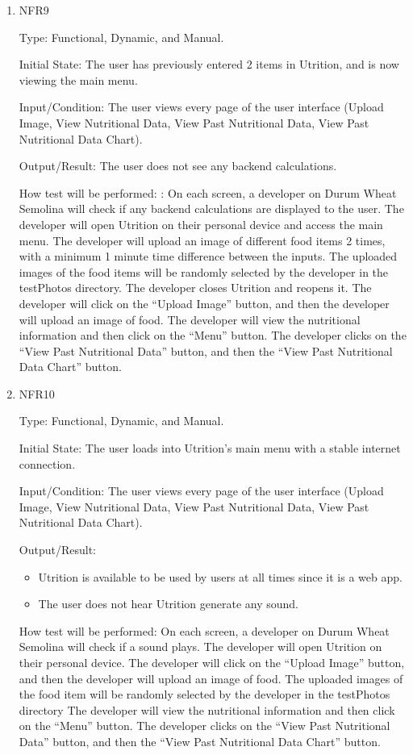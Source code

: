 \documentclass[12pt, titlepage]{article}
\begin{document}
\begin{enumerate}
\item{NFR9\\}

Type: Functional, Dynamic, and Manual.

Initial State: The user has previously entered 2 items in Utrition, and is now viewing the main menu.

Input/Condition: The user views every page of the user interface (Upload Image, View Nutritional Data, View Past Nutritional Data, View Past Nutritional Data Chart).

Output/Result: The user does not see any backend calculations.

How test will be performed: : On each screen, a developer on Durum Wheat Semolina will check if any backend calculations are displayed to the user. The developer will open Utrition on their personal device and access the main menu. The developer will upload an image of different food items 2 times, with a minimum 1 minute time difference between the inputs. The uploaded images of the food items will be randomly selected by the developer in the testPhotos directory. The developer closes Utrition and reopens it. The developer will click on the “Upload Image” button, and then the developer will upload an image of food. The developer will view the nutritional information and then click on the “Menu” button. The developer clicks on the “View Past Nutritional Data'' button, and then the “View Past Nutritional Data Chart” button.

\item{NFR10\\}

Type: Functional, Dynamic, and Manual.

Initial State: The user loads into Utrition’s main menu with a stable internet connection.

Input/Condition: The user views every page of the user interface (Upload Image, View Nutritional Data, View Past Nutritional Data, View Past Nutritional Data Chart).

Output/Result: 
\begin{itemize}
	\item Utrition is available to be used by users at all times since it is a web app.
	\item The user does not hear Utrition generate any sound.
\end{itemize}

How test will be performed: On each screen, a developer on Durum Wheat Semolina will check if a sound plays. The developer will open Utrition on their personal device. The developer will click on the “Upload Image” button, and then the developer will upload an image of food. The uploaded images of the food item will be randomly selected by the developer in the testPhotos directory The developer will view the nutritional information and then click on the “Menu” button. The developer clicks on the “View Past Nutritional Data” button, and then the “View Past Nutritional Data Chart” button.


\end{enumerate}
\end{document}
